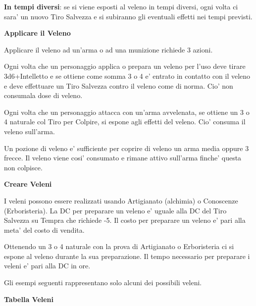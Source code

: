 \documentclass[a4paper,11pt,twoside,openany]{book}
\begin{document}
{\textbf{In tempi diversi}: se si viene esposti al veleno in tempi diversi, ogni volta ci sara' un nuovo Tiro Salvezza e si subiranno gli eventuali effetti nei tempi previsti.

\bigskip

\textbf{Applicare il Veleno}

Applicare il veleno ad un'arma o ad una munizione richiede 3 azioni.

Ogni volta che un personaggio applica o prepara un veleno per l'uso deve tirare 3d6+Intelletto e se ottiene come somma 3 o 4 e' entrato in contatto con il veleno e deve effettuare un Tiro Salvezza contro il veleno come di norma. Cio' non consumala dose di veleno. 

Ogni volta che un personaggio attacca con un'arma avvelenata, se ottiene un 3 o 4 naturale col Tiro per Colpire, si espone agli effetti del veleno. Cio' consuma il veleno sull'arma.

Un pozione di veleno e' sufficiente per coprire di veleno un arma media oppure 3 frecce. Il veleno viene cosi' consumato e rimane attivo sull'arma finche' questa non colpisce.

\textbf{Creare Veleni}

I veleni possono essere realizzati usando Artigianato (alchimia) o Conoscenze (Erboristeria). La DC per preparare un veleno e' uguale alla DC del Tiro Salvezza su Tempra che richiede -5. Il costo per preparare un veleno e' pari alla meta' del costo di vendita.

Ottenendo un 3 o 4 naturale con la prova di Artigianato o Erboristeria ci si espone al veleno durante la sua preparazione. Il tempo necessario per preparare i veleni e' pari alla DC in ore. 

Gli esempi seguenti rappresentano solo alcuni dei possibili veleni.
\bigskip

\textbf{Tabella Veleni}

\medskip

}
\end{document}

